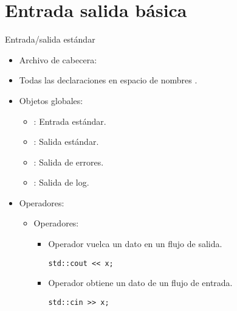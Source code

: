 \section{Entrada salida básica}

\begin{frame}[fragile]{Entrada/salida estándar}
\begin{itemize}
  \item Archivo de cabecera: 
  \item Todas las declaraciones en espacio de nombres .
  \item Objetos globales:
    \begin{itemize}
      \item {}: Entrada estándar.
      \item {}: Salida estándar.
      \item {}: Salida de errores.
      \item {}: Salida de log.
    \end{itemize}
  \item Operadores:
    \begin{itemize}
      \item Operadores:
        \begin{itemize}
          \item Operador \cppid{<{}<} vuelca un dato en un flujo de salida.
\begin{lstlisting}
std::cout << x;
\end{lstlisting}
          \item Operador \cppid{>{}>} obtiene un dato de un flujo de entrada.
\begin{lstlisting}
std::cin >> x;
\end{lstlisting}
        \end{itemize}
    \end{itemize}
\end{itemize}
\end{frame}

